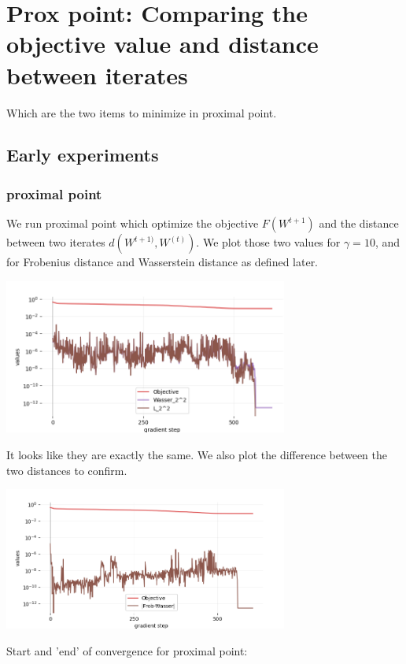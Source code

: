 \section{Prox point: Comparing the objective value and distance between iterates}
Which are the two items to minimize in proximal point.
\subsection{Early experiments}
\subsubsection{proximal point}

We run proximal point which optimize the objective $F(W^{t+1})$ and the distance between two iterates $d(W^{t+1)}, W^{(t)})$. We plot those two values for $\gamma=10$, and for Frobenius distance and Wasserstein distance as defined later.

\includegraphics[width=0.7\textwidth]{imgs/tau10_graph_full.png}

It looks like they are exactly the same. We also plot the difference between the two distances to confirm.

\includegraphics[width=0.7\textwidth]{imgs/tau10_graph.png}

Start and 'end' of convergence for proximal point:

